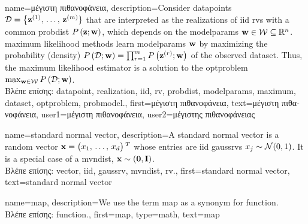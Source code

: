 {name={\foreignlanguage{greek}{μέγιστη πιθανοφάνεια}}, 
	description={Consider \gls{datapoint}s $\mathcal{D}=\big\{ {\bf z}^{(1)}, \,\ldots, \,{\bf z}^{(m)} \}$ 
		that are interpreted as the \gls{realization}s of \gls{iid} \gls{rv}s with a common \gls{probdist} $P\left({\bf z}; {\bf w}\right)$, which 
		depends on the \glspl{modelparam} ${\bf w} \in \mathcal{W} \subseteq \mathbb{R}^{n}$. 
		\Gls{maximum} likelihood methods learn \glspl{modelparam} ${\bf w}$ by maximizing 
		the probability (density) $P\left(\mathcal{D}; {\bf w}\right) = \prod_{r=1}^{m} P\left({\bf z}^{(r)}; {\bf w}\right)$ 
		of the observed \gls{dataset}. Thus, the \gls{maximum} likelihood estimator is a 
		solution to the \gls{optproblem} $\max_{{\bf w} \in \mathcal{W}} P\left(\mathcal{D}; {\bf w}\right)$.\\
		\foreignlanguage{greek}{Βλέπε επίσης:} \gls{datapoint}, \gls{realization}, \gls{iid}, \gls{rv}, \gls{probdist}, \glspl{modelparam}, \gls{maximum}, 
		\gls{dataset}, \gls{optproblem}, \gls{probmodel}.},
	first={\foreignlanguage{greek}{μέγιστη πιθανοφάνεια}},
	text={\foreignlanguage{greek}{μέγιστη πιθανοφάνεια}},
	user1={\foreignlanguage{greek}{μέγιστη πιθανοφάνεια}}, %
  	user2={\foreignlanguage{greek}{μέγιστης πιθανοφά\-νει\-ας}} %
}

{name={standard normal vector}, 
	description={A standard normal \gls{vector} is a random \gls{vector} ${\bf x}=\big(x_{1}, \,\ldots, \,x_{d}\big)\,^{T}$ 
		whose entries are \gls{iid} \gls{gaussrv}s $x_{j} \sim \mathcal{N}(0,1)$. 
		It is a special case of a \gls{mvndist}, ${\bf x} \sim \mathcal(\mathbf{0},\mathbf{I})$. \\ 
		\foreignlanguage{greek}{Βλέπε επίσης:} \gls{vector}, \gls{iid}, \gls{gaussrv}, \gls{mvndist}, \gls{rv}.}, 
	first={standard normal vector},
	text={standard normal vector}
}

{name={map},
	description={We use the term map as a synonym for \gls{function}. \\
		\foreignlanguage{greek}{Βλέπε επίσης:} \gls{function}.},
	first={map},
	type=math, 
	text={map}
}

